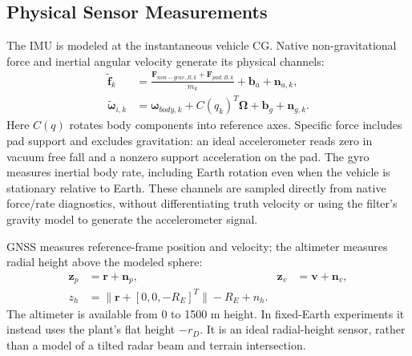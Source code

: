 \subsection{Physical Sensor Measurements}\label{sec:nav-sensors}
The IMU is modeled at the instantaneous vehicle CG. Native non-gravitational force and
inertial angular velocity generate its physical channels:
\begin{align}
 \widetilde{\bm f}_k&=\frac{\bm F_{non-grav,B,k}+\bm F_{pad,B,k}}{m_k}
                         +\bm b_a+\bm n_{a,k},\\
 \widetilde{\bm\omega}_{i,k}&=\bm\omega_{body,k}
                       +C(q_k)^T\bm\Omega+\bm b_g+\bm n_{g,k}.
\end{align}
Here $C(q)$ rotates body components into reference axes. Specific force includes pad
support and excludes gravitation: an ideal accelerometer reads zero in vacuum free fall
and a nonzero support acceleration on the pad. The gyro measures inertial body rate,
including Earth rotation even when the vehicle is stationary relative to Earth. These
channels are sampled directly from native force/rate diagnostics, without differentiating
truth velocity or using the filter's gravity model to generate the accelerometer signal.

GNSS measures reference-frame position and velocity; the altimeter measures radial height
above the modeled sphere:
\begin{align}
 \bm z_p&=\bm r+\bm n_p,&\bm z_v&=\bm v+\bm n_v,\\
 z_h&=\|\bm r+[0,0,-R_E]^T\|-R_E+n_h.
\end{align}
The altimeter is available from 0 to 1500 m height. In fixed-Earth experiments it instead
uses the plant's flat height $-r_D$. It is an ideal radial-height sensor, rather than a
model of a tilted radar beam and terrain intersection.

